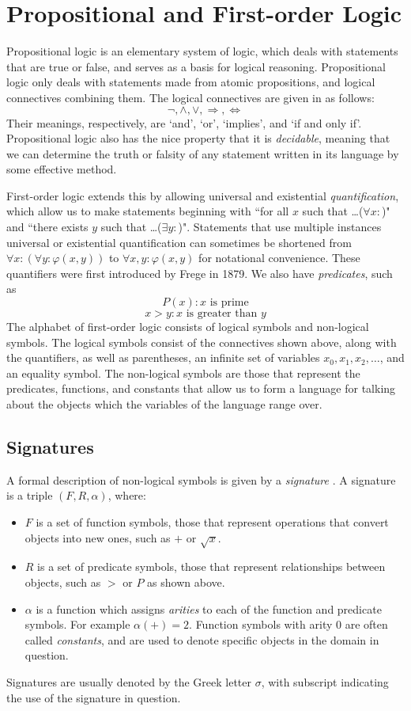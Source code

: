 \documentclass[11pt]{report}
\theoremstyle{definition}
\theoremstyle{theorem}
\theoremstyle{lemma}
\begin{document}
\section{Propositional and First-order Logic}
Propositional logic is an elementary system of logic, which deals with statements that are true or false, and serves as a basis for logical reasoning. Propositional logic only deals with statements made from atomic propositions, and logical connectives combining them. The logical connectives are given in \cite[p.~2]{beckert} as follows:
$$\neg, \wedge, \vee,\Rightarrow,\Leftrightarrow$$
Their meanings, respectively, are `and', `or', `implies', and `if and only if'.
Propositional logic also has the nice property that it is \emph{decidable}, meaning that we can determine the truth or falsity of any statement written in its language by some effective method.

First-order logic extends this by allowing universal and existential \emph{quantification}, which allow us to make statements beginning with ``for all $x$ such that \ldots ($\forall x:$)" and ``there exists $y$ such that \ldots ($\exists y:$)". Statements that use multiple instances universal or existential quantification can sometimes be shortened from $\forall x:(\forall y: \varphi(x,y))$ to $\forall x,y: \varphi(x,y)$ for notational convenience.
These quantifiers were first introduced by Frege \cite{frege} in 1879.
We also have \emph{predicates}, such as
$$P(x) : x \text{ is prime}$$
$$ x > y : x \text{ is greater than } y$$
\noindent
The alphabet of first-order logic consists of logical symbols and non-logical symbols.
The logical symbols consist of the connectives shown above, along with the quantifiers, as well as parentheses, an infinite set of variables $x_0, x_1, x_2,\ldots$, and an equality symbol.
The non-logical symbols are those that represent the predicates, functions, and constants that allow us to form a language for talking about the objects which the variables of the language range over.

\subsection{Signatures}
A formal description of non-logical symbols is
given by a \emph{signature} \cite[ch. 1.1]{selinger}. A signature is a triple $(F,R,\alpha)$, where:
\begin{itemize}
\item $F$ is a set of function symbols, those that represent operations that convert objects into new ones, such as $+$ or $\sqrt{x}$.
\item $R$ is a set of predicate symbols, those that represent relationships between objects, such as $>$ or $P$ as shown above.
\item $\alpha$ is a function which assigns \emph{arities} to each of the function and predicate symbols.
For example $\alpha(+) = 2$. Function symbols with arity $0$ are often called \emph{constants}, and are used to denote specific objects in the domain in question.
\end{itemize}
Signatures are usually denoted by the Greek letter $\sigma$, with subscript indicating the use of the signature in question.
\end{document}
